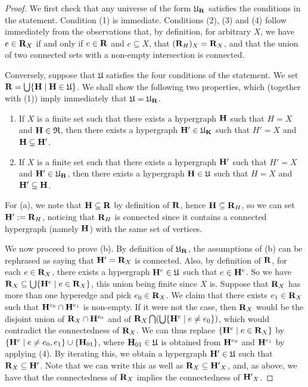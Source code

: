 \documentclass[11pt]{article}
\theoremstyle{definition}
\numberwithin{equation}{section}
\numberwithin{equation}{section}
\newcommand{\inc}{\subseteq}
\newcommand{\set}[1]{\{#1\}}
\newcommand{\setc}[2]{\set{#1 \mid #2}}
\newcommand{\union}{\cup}		%
\newcommand{\Union}{\bigcup}		%
\newcommand{\hyper}[1]{{\bf #1}}
\begin{document}
\begin{proof} We first check that any universe of the form $\mathfrak{U}_{\hyper{R}}$ satisfies the conditions in the statement. Condition (1) is immediate. Conditions (2), (3) and (4)  follow immediately from the observations that, by definition, for arbitrary $X$, we have  $e\in\hyper{R}_X$ if and only if $e\in\hyper{R}$ and $e\inc X$, that 
$(\hyper{R}_H)_X=\hyper{R}_X$, and that the union of two connected sets with a non-empty intersection is connected.


Conversely, suppose that $\mathfrak{U}$ satisfies the four conditions of the statement. We set $\hyper{R}=\Union\setc{\hyper{H}}{\hyper{H}\in\mathfrak{U}}$.  We shall show the following two properties, which (together with (1)) imply immediately that $\mathfrak{U}
=\mathfrak{U}_{\hyper{R}}$.
\begin{enumerate}
\item[(a)] If $X$ is a finite set such that there exists a hypergraph $\hyper{H}$ such that $H=X$ and $\hyper{H}\in\mathfrak{R}$, then there exists a hypergraph 
$\hyper{H}'\in \mathfrak{U}_{\hyper{K}}$ such that $H'=X$ and $\hyper{H}\inc\hyper{H}'$.
\item[(b)] If $X$ is a finite set such that there exists a hypergraph $\hyper{H}'$ such that $H'=X$ and $\hyper{H}'\in\mathfrak{U}_{\hyper{R}}$, then there exists a hypergraph 
$\hyper{H}\in \mathfrak{U}$ such that $H=X$ and  $\hyper{H}'\inc\hyper{H}$.
\end{enumerate}
For (a), we note that $\hyper{H}\inc \hyper{R}$ by definition of $\hyper{R}$, hence $\hyper{H}\inc \hyper{R}_H$, so we can set  
$\hyper{H}':= \hyper{R}_H$, noticing that $\hyper{R}_H$ is connected since  it contains a connected hypergraph (namely $\hyper{H}$) with the same set of vertices. 

We now proceed to prove (b).  By definition of $\mathfrak{U}_{\hyper{R}}$, the assumptions of (b) can be rephrased as saying that $\hyper{H}'=\hyper{R}_X$ is connected. Also,
by definition of $\hyper{R}$, for each $e\in \hyper{R}_X$, there exists a hypergraph $\hyper{H}^e\in\mathfrak{U}$ such that $e\in \hyper{H}^e$.
So we have $\hyper{R}_X\inc \Union \setc{\hyper{H}^e}{e\in \hyper{R}_X}$, this union being finite since $X$ is.  Suppose that $\hyper{R}_X$ has more than one hyperedge and pick  $e_0\in\hyper{R}_X$. We claim that there exists $e_1\in\hyper{R}_X$ such that 
$\hyper{H}^{e_0}\cap \hyper{H}^{e_1}$ is non-empty. If it were not the case, then  $\hyper{R}_X$ would be the disjoint union of $\hyper{R}_X\cap \hyper{H}^{e_0}$ and of $\hyper{R}_X \bigcap (\Union\setc{\hyper{H}^e}{e\neq e_0})$, which would  contradict the connectedness of $\hyper{R}_X$.  
We can thus replace $\setc{\hyper{H}^e}{e\in \hyper{R}_X}$ by $\setc{\hyper{H}^e}{e\neq e_0,e_1}\union\set{\hyper{H}_{01}}$, where $\hyper{H}_{01}\in\mathfrak{U}$ is obtained from $\hyper{H}^{e_0}$ and  $\hyper{H}^{e_1}$ by applying (4). By iterating this, we obtain a hypergraph $\hyper{H}'\in\mathfrak{U}$ such that $\hyper{R}_X\inc \hyper{H'}$. Note that we can write this as well as
$\hyper{R}_X\inc \hyper{H'}_X$, and, as above, we have that the connectedness of $\hyper{R}_X$ implies the connectedness of 
$\hyper{H'}_X$.


\end{proof}
\end{document}
